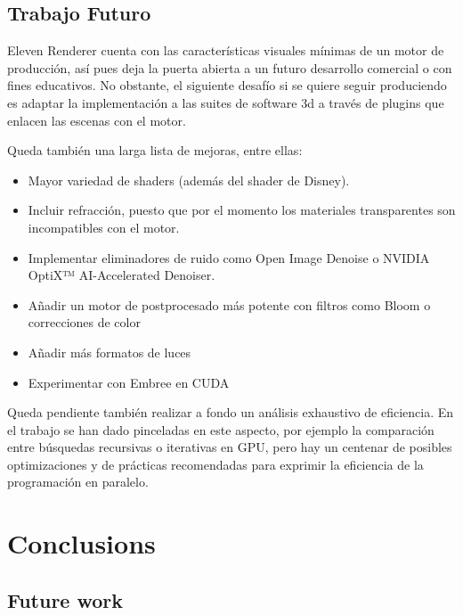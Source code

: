 
\section{Trabajo Futuro}
	
Eleven Renderer cuenta con las características visuales mínimas de un motor de producción, así pues deja la puerta abierta a un futuro desarrollo comercial o con fines educativos. No obstante, el siguiente desafío si se quiere seguir produciendo es adaptar la implementación a las suites de software 3d a través de plugins que enlacen las escenas con el motor. 

Queda también una larga lista de mejoras, entre ellas:

\begin{itemize}
	
	\item Mayor variedad de shaders (además del shader de Disney).
	\item Incluir refracción, puesto que por el momento los materiales transparentes son incompatibles con el motor.
	\item Implementar eliminadores de ruido como Open Image Denoise o NVIDIA OptiX™ AI-Accelerated Denoiser.
	\item Añadir un motor de postprocesado más potente con filtros como Bloom o correcciones de color
	\item Añadir más formatos de luces
	\item Experimentar con Embree en CUDA
	
\end{itemize}

Queda pendiente también realizar a fondo un análisis exhaustivo de eficiencia. En el trabajo se han dado pinceladas en este aspecto, por ejemplo la comparación entre búsquedas recursivas o iterativas en GPU, pero hay un centenar de posibles optimizaciones y de prácticas recomendadas para exprimir la eficiencia de la programación en paralelo.

\chapter*{Conclusions}


\section{Future work}
	

